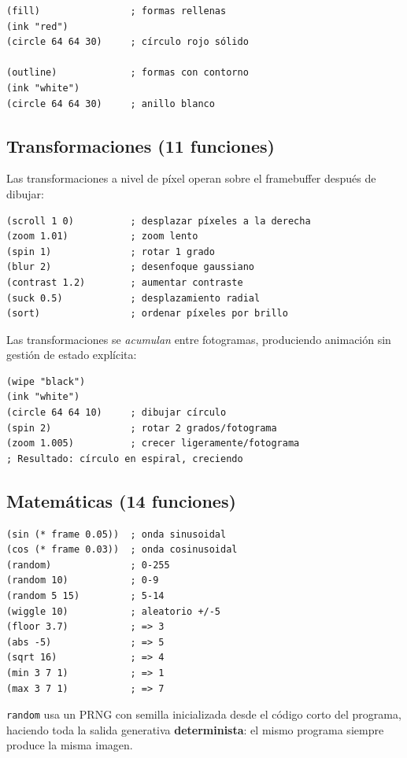 \documentclass[10pt,letterpaper,twocolumn]{article}
\begin{document}
\begin{lstlisting}
(fill)                ; formas rellenas
(ink "red")
(circle 64 64 30)     ; círculo rojo sólido

(outline)             ; formas con contorno
(ink "white")
(circle 64 64 30)     ; anillo blanco
\end{lstlisting}

\subsection{Transformaciones (11 funciones)}

Las transformaciones a nivel de píxel operan sobre el framebuffer después de dibujar:

\begin{lstlisting}
(scroll 1 0)          ; desplazar píxeles a la derecha
(zoom 1.01)           ; zoom lento
(spin 1)              ; rotar 1 grado
(blur 2)              ; desenfoque gaussiano
(contrast 1.2)        ; aumentar contraste
(suck 0.5)            ; desplazamiento radial
(sort)                ; ordenar píxeles por brillo
\end{lstlisting}

Las transformaciones se \emph{acumulan} entre fotogramas, produciendo animación sin gestión de estado explícita:

\begin{lstlisting}
(wipe "black")
(ink "white")
(circle 64 64 10)     ; dibujar círculo
(spin 2)              ; rotar 2 grados/fotograma
(zoom 1.005)          ; crecer ligeramente/fotograma
; Resultado: círculo en espiral, creciendo
\end{lstlisting}

\subsection{Matemáticas (14 funciones)}

\begin{lstlisting}
(sin (* frame 0.05))  ; onda sinusoidal
(cos (* frame 0.03))  ; onda cosinusoidal
(random)              ; 0-255
(random 10)           ; 0-9
(random 5 15)         ; 5-14
(wiggle 10)           ; aleatorio +/-5
(floor 3.7)           ; => 3
(abs -5)              ; => 5
(sqrt 16)             ; => 4
(min 3 7 1)           ; => 1
(max 3 7 1)           ; => 7
\end{lstlisting}

\texttt{random} usa un PRNG con semilla inicializada desde el código corto del programa, haciendo toda la salida generativa \textbf{determinista}: el mismo programa siempre produce la misma imagen.
\end{document}
